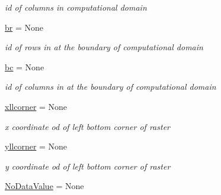 \begin{DoxyCompactItemize}
\begin{DoxyCompactList}\small\item\em id of columns in computational domain \end{DoxyCompactList}\item 
\hypertarget{classmain__src_1_1main__classes_1_1General_1_1Globals_afc2a5a6b505fcdd30aadcf7e91f16d35}{\hyperlink{classmain__src_1_1main__classes_1_1General_1_1Globals_afc2a5a6b505fcdd30aadcf7e91f16d35}{br} = None}\label{classmain__src_1_1main__classes_1_1General_1_1Globals_afc2a5a6b505fcdd30aadcf7e91f16d35}

\begin{DoxyCompactList}\small\item\em id of rows in at the boundary of computational domain \end{DoxyCompactList}\item 
\hypertarget{classmain__src_1_1main__classes_1_1General_1_1Globals_a5ddaae269873aa418a85562e93cddebd}{\hyperlink{classmain__src_1_1main__classes_1_1General_1_1Globals_a5ddaae269873aa418a85562e93cddebd}{bc} = None}\label{classmain__src_1_1main__classes_1_1General_1_1Globals_a5ddaae269873aa418a85562e93cddebd}

\begin{DoxyCompactList}\small\item\em id of columns in at the boundary of computational domain \end{DoxyCompactList}\item 
\hypertarget{classmain__src_1_1main__classes_1_1General_1_1Globals_a4bdba70a7b2f816b02a991dae9d65bec}{\hyperlink{classmain__src_1_1main__classes_1_1General_1_1Globals_a4bdba70a7b2f816b02a991dae9d65bec}{xllcorner} = None}\label{classmain__src_1_1main__classes_1_1General_1_1Globals_a4bdba70a7b2f816b02a991dae9d65bec}

\begin{DoxyCompactList}\small\item\em x coordinate od of left bottom corner of raster \end{DoxyCompactList}\item 
\hypertarget{classmain__src_1_1main__classes_1_1General_1_1Globals_aabba5a6d8f1516d4dc976a67dc71fdc0}{\hyperlink{classmain__src_1_1main__classes_1_1General_1_1Globals_aabba5a6d8f1516d4dc976a67dc71fdc0}{yllcorner} = None}\label{classmain__src_1_1main__classes_1_1General_1_1Globals_aabba5a6d8f1516d4dc976a67dc71fdc0}

\begin{DoxyCompactList}\small\item\em y coordinate od of left bottom corner of raster \end{DoxyCompactList}\item 
\hypertarget{classmain__src_1_1main__classes_1_1General_1_1Globals_abfb9d5ec55467067d005c8bfe500ab48}{\hyperlink{classmain__src_1_1main__classes_1_1General_1_1Globals_abfb9d5ec55467067d005c8bfe500ab48}{No\-Data\-Value} = None}\label{classmain__src_1_1main__classes_1_1General_1_1Globals_abfb9d5ec55467067d005c8bfe500ab48}


\end{DoxyCompactItemize}
